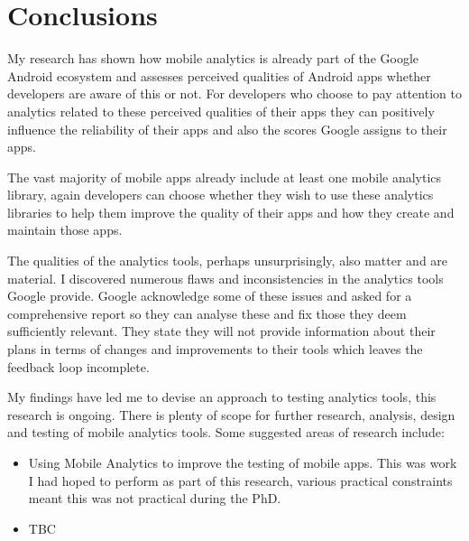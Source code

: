 \chapter{Conclusions}
My research has shown how mobile analytics is already part of the Google Android ecosystem and assesses perceived qualities of Android apps whether developers are aware of this or not. For developers who choose to pay attention to analytics related to these perceived qualities of their apps they can positively influence the reliability of their apps and also the scores Google assigns to their apps. 

The vast majority of mobile apps already include at least one mobile analytics library, again developers can choose whether they wish to use these analytics libraries to help them improve the quality of their apps and how they create and maintain those apps. 

The qualities of the analytics tools, perhaps unsurprisingly, also matter and are material. I discovered numerous flaws and inconsistencies in the analytics tools Google provide. Google acknowledge some of these issues and asked for a comprehensive report so they can analyse these and fix those they deem sufficiently relevant. They state they will not provide information about their plans in terms of changes and improvements to their tools which leaves the feedback loop incomplete.

My findings have led me to devise an approach to testing analytics tools, this research is ongoing. There is plenty of scope for further research, analysis, design and testing of mobile analytics tools. Some suggested areas of research include:

\begin{itemize}
    \item Using Mobile Analytics to improve the testing of mobile apps. This was work I had hoped to perform as part of this research, various practical constraints meant this was not practical during the PhD.
    \item TBC
\end{itemize}

